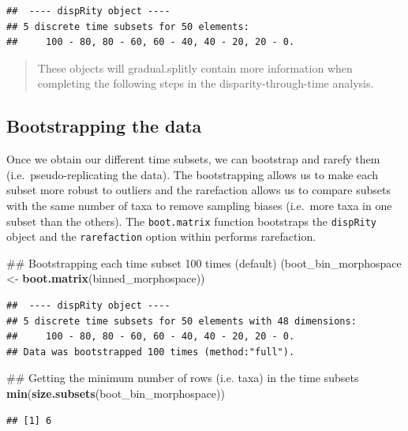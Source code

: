 \documentclass[]{book}
\newenvironment{Shaded}{\begin{snugshade}}{\end{snugshade}}
\newcommand{\KeywordTok}[1]{\textcolor[rgb]{0.13,0.29,0.53}{\textbf{#1}}}
\newcommand{\StringTok}[1]{\textcolor[rgb]{0.31,0.60,0.02}{#1}}
\newcommand{\NormalTok}[1]{#1}
\theoremstyle{definition}
\theoremstyle{definition}
\theoremstyle{remark}
\begin{document}
\begin{verbatim}
##  ---- dispRity object ---- 
## 5 discrete time subsets for 50 elements:
##     100 - 80, 80 - 60, 60 - 40, 40 - 20, 20 - 0.
\end{verbatim}

\begin{quote}
These objects will gradual.splitly contain more information when
completing the following steps in the disparity-through-time analysis.
\end{quote}

\subsection{Bootstrapping the data}\label{bootstrapping-the-data}

Once we obtain our different time subsets, we can bootstrap and rarefy
them (i.e.~pseudo-replicating the data). The bootstrapping allows us to
make each subset more robust to outliers and the rarefaction allows us
to compare subsets with the same number of taxa to remove sampling
biases (i.e.~more taxa in one subset than the others). The
\texttt{boot.matrix} function bootstraps the \texttt{dispRity} object
and the \texttt{rarefaction} option within performs rarefaction.

\begin{Shaded}
\begin{Highlighting}[]
\NormalTok{## Bootstrapping each time subset 100 times (default)}
\NormalTok{(boot_bin_morphospace <-}\StringTok{ }\KeywordTok{boot.matrix}\NormalTok{(binned_morphospace))}
\end{Highlighting}
\end{Shaded}

\begin{verbatim}
##  ---- dispRity object ---- 
## 5 discrete time subsets for 50 elements with 48 dimensions:
##     100 - 80, 80 - 60, 60 - 40, 40 - 20, 20 - 0.
## Data was bootstrapped 100 times (method:"full").
\end{verbatim}

\begin{Shaded}
\begin{Highlighting}[]
\NormalTok{## Getting the minimum number of rows (i.e. taxa) in the time subsets}
\KeywordTok{min}\NormalTok{(}\KeywordTok{size.subsets}\NormalTok{(boot_bin_morphospace))}
\end{Highlighting}
\end{Shaded}

\begin{verbatim}
## [1] 6
\end{verbatim}
\end{document}
